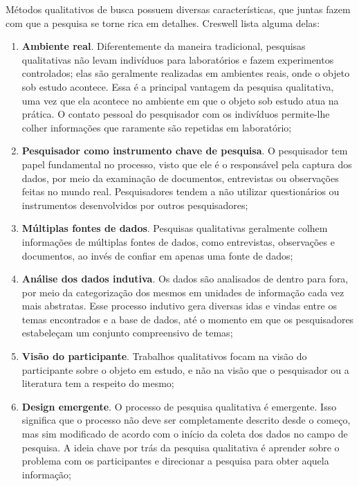 Métodos qualitativos de busca possuem diversas características, que juntas fazem
com que a pesquisa se torne rica em detalhes. Creswell \cite{creswell} lista
alguma delas:

\begin{enumerate}
  
  \item \textbf{Ambiente real}. Diferentemente da maneira tradicional,
  pesquisas qualitativas não levam indivíduos para laboratórios e fazem experimentos
  controlados; elas são geralmente realizadas em ambientes reais, onde o objeto
  sob estudo acontece. Essa é a principal vantagem da pesquisa qualitativa, uma vez
  que ela acontece no ambiente em que o objeto sob estudo atua na prática. O
  contato pessoal do pesquisador com os indivíduos permite-lhe colher
  informações que raramente são repetidas em laboratório;
  
  \item \textbf{Pesquisador como instrumento chave de pesquisa}. O pesquisador
  tem papel fundamental no processo, visto que ele é o responsável pela captura dos
  dados, por meio da examinação de documentos, entrevistas ou observações feitas
  no mundo real. Pesquisadores tendem a não utilizar questionários ou
  instrumentos desenvolvidos por outros pesquisadores;
  
  \item \textbf{Múltiplas fontes de dados}. Pesquisas qualitativas geralmente
  colhem informações de múltiplas fontes de dados, como entrevistas,
  observações e documentos, ao invés de confiar em apenas uma fonte de dados;
  
  \item \textbf{Análise dos dados indutiva}. Os dados são analisados de dentro
  para fora, por meio da categorização dos mesmos em unidades de informação cada
  vez mais abstratas. Esse processo indutivo gera diversas idas e vindas entre
  os temas encontrados e a base de dados, até o momento em que os pesquisadores
  estabeleçam um conjunto compreensivo de temas;
  
  \item \textbf{Visão do participante}. Trabalhos qualitativos focam na visão do
  participante sobre o objeto em estudo, e não na visão que o pesquisador ou a
  literatura tem a respeito do mesmo;
  
  \item \textbf{Design emergente}. O processo de pesquisa qualitativa é
  emergente. Isso significa que o processo não deve ser completamente descrito
  desde o começo, mas sim modificado de acordo com o início da coleta dos dados
  no campo de pesquisa. A ideia chave por trás da pesquisa qualitativa é
  aprender sobre o problema com os participantes e direcionar a pesquisa para
  obter aquela informação;
  

\end{enumerate}
